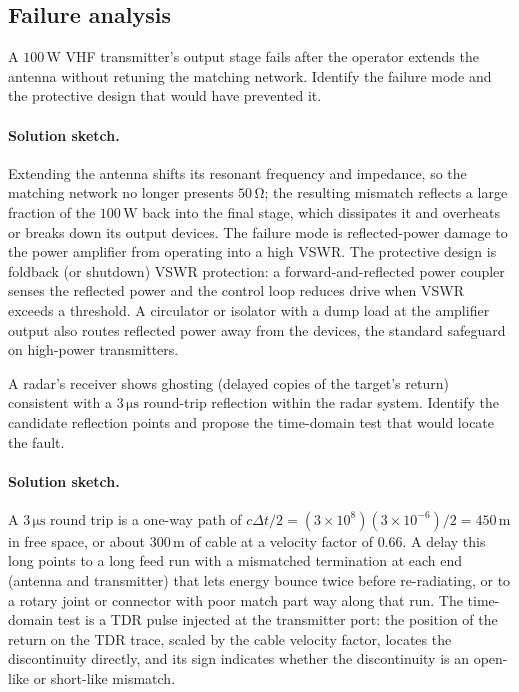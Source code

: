 \subsection*{Failure analysis}

\begin{exercise}
A $100\,\si{\watt}$ VHF transmitter's output stage fails after the
operator extends the antenna without retuning the matching network.
Identify the failure mode and the protective design that would have
prevented it.
\paragraph{Solution sketch.} Extending the antenna shifts its resonant
frequency and impedance, so the matching network no longer presents
$50\,\si{\ohm}$; the resulting mismatch reflects a large fraction of the
$100\,\si{\watt}$ back into the final stage, which dissipates it and
overheats or breaks down its output devices. The failure mode is
reflected-power damage to the power amplifier from operating into a high
VSWR. The protective design is foldback (or shutdown) VSWR protection: a
forward-and-reflected power coupler senses the reflected power and the
control loop reduces drive when VSWR exceeds a threshold. A circulator
or isolator with a dump load at the amplifier output also routes
reflected power away from the devices, the standard safeguard on
high-power transmitters.
\end{exercise}

\begin{exercise}
A radar's receiver shows ghosting (delayed copies of the target's
return) consistent with a $3\,\si{\micro\second}$ round-trip
reflection within the radar system. Identify the candidate reflection
points and propose the time-domain test that would locate the fault.
\paragraph{Solution sketch.} A $3\,\si{\micro\second}$ round trip is a
one-way path of $c\Delta t/2 = (3\times 10^{8})(3\times 10^{-6})/2 =
450\,\si{\meter}$ in free space, or about $300\,\si{\meter}$ of cable at
a velocity factor of $0.66$. A delay this long points to a long feed run
with a mismatched termination at each end (antenna and transmitter) that
lets energy bounce twice before re-radiating, or to a rotary joint or
connector with poor match part way along that run. The time-domain test
is a TDR pulse injected at the transmitter port: the position of the
return on the TDR trace, scaled by the cable velocity factor, locates
the discontinuity directly, and its sign indicates whether the
discontinuity is an open-like or short-like mismatch.
\end{exercise}

